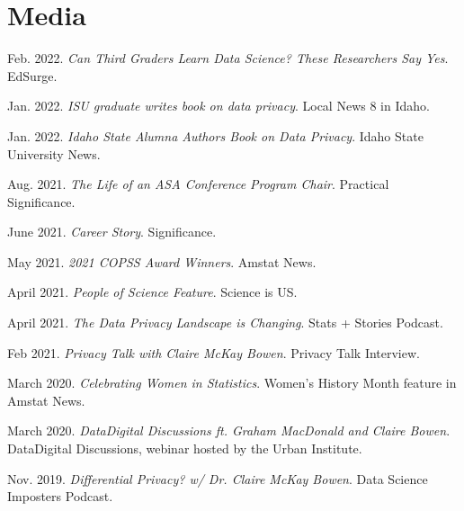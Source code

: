 \documentclass[11pt, letterpaper, roman]{moderncv} %
\begin{document}

\section{Media}
\begin{etaremune}[topsep=0pt, itemsep=4pt, partopsep=0pt, parsep=0pt]
    \item Feb. 2022. \textit{Can Third Graders Learn Data Science? These Researchers Say Yes}. EdSurge.
    
    \item Jan. 2022. \textit{ISU graduate writes book on data privacy}. Local News 8 in Idaho.
    
    \item Jan. 2022. \textit{Idaho State Alumna Authors Book on Data Privacy}. Idaho State University News.

    \item Aug. 2021. \textit{The Life of an ASA Conference Program Chair}. Practical Significance.    

    \item June 2021. \textit{Career Story}. Significance.
    
    \item May 2021. \textit{2021 COPSS Award Winners}. Amstat News.
    
    \item April 2021. \textit{People of Science Feature}. Science is US.
    
    \item April 2021. \textit{The Data Privacy Landscape is Changing}. Stats + Stories Podcast.
    
    \item Feb 2021. \textit{Privacy Talk with Claire McKay Bowen}. Privacy Talk Interview.

    \item March 2020. \textit{Celebrating Women in Statistics}. Women's History Month feature in Amstat News.

    \item March 2020. \textit{Data\@Urban Digital Discussions ft. Graham MacDonald and Claire Bowen}. Data\@Urban Digital Discussions, webinar hosted by the Urban Institute.
    
    \item Nov. 2019. \textit{Differential Privacy? w/ Dr. Claire McKay Bowen}. Data Science Imposters Podcast.
\end{etaremune}
\end{document}
